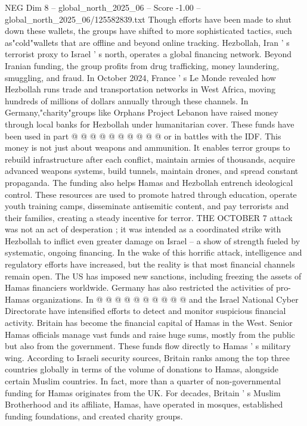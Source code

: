\begin{textsample}{NEG Dim 8 – global\_north\_2025\_06 – Score -1.00 – global\_north\_2025\_06/125582839.txt}
Though efforts have been made to shut down these wallets, the groups have shifted to more sophisticated tactics, such as"cold"wallets that are offline and beyond online tracking.
Hezbollah, Iran ' s terrorist proxy to Israel ' s north, operates a global financing network.
Beyond Iranian funding, the group profits from drug trafficking, money laundering, smuggling, and fraud.
In October 2024, France ' s Le Monde revealed how Hezbollah runs trade and transportation networks in West Africa, moving hundreds of millions of dollars annually through these channels.
In Germany,"charity"groups like Orphans Project Lebanon have raised money through local banks for Hezbollah under humanitarian cover.
These funds have been used in part @ @ @ @ @ @ @ @ @ @ or in battles with the IDF.
This money is not just about weapons and ammunition.
It enables terror groups to rebuild infrastructure after each conflict, maintain armies of thousands, acquire advanced weapons systems, build tunnels, maintain drones, and spread constant propaganda.
The funding also helps Hamas and Hezbollah entrench ideological control.
These resources are used to promote hatred through education, operate youth training camps, disseminate antisemitic content, and pay terrorists and their families, creating a steady incentive for terror.
THE OCTOBER 7 attack was not an act of desperation ; it was intended as a coordinated strike with Hezbollah to inflict even greater damage on Israel -- a show of strength fueled by systematic, ongoing financing.
In the wake of this horrific attack, intelligence and regulatory efforts have increased, but the reality is that most financial channels remain open.
The US has imposed new sanctions, including freezing the assets of Hamas financiers worldwide.
Germany has also restricted the activities of pro-Hamas organizations.
In @ @ @ @ @ @ @ @ @ @ and the Israel National Cyber Directorate have intensified efforts to detect and monitor suspicious financial activity.
Britain has become the financial capital of Hamas in the West.
Senior Hamas officials manage vast funds and raise huge sums, mostly from the public but also from the government.
These funds flow directly to Hamas ' s military wing.
According to Israeli security sources, Britain ranks among the top three countries globally in terms of the volume of donations to Hamas, alongside certain Muslim countries.
In fact, more than a quarter of non-governmental funding for Hamas originates from the UK.
For decades, Britain ' s Muslim Brotherhood and its affiliate, Hamas, have operated in mosques, established funding foundations, and created charity groups.

\end{textsample}

